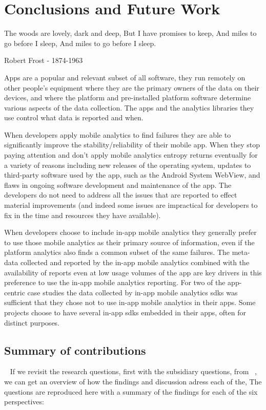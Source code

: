 \setchapterpreamble[u]{\margintoc}
\chapter{Conclusions and Future Work}\label{chapter-conclusions-and-future-work}

\epigraph{The woods are lovely, dark and deep,
But I have promises to keep,   
And miles to go before I sleep,   
And miles to go before I sleep.}{Robert Frost - 1874-1963}

Apps are a popular and relevant subset of all software, they run remotely on other people’s equipment where they are the primary owners of the data on their devices, and where the platform and pre-installed platform software determine various aspects of the data collection. The apps and the analytics libraries they use control what data is reported and when. 

When developers apply mobile analytics to find failures they are able to significantly improve the stability/reliability of their mobile app. When they stop paying attention and don't apply mobile analytics entropy returns eventually for a variety of reasons including new releases of the operating system, updates to third-party software used by the app, such as the Android System WebView, and flaws in ongoing software development and maintenance of the app. The developers do not need to address all the issues that are reported to effect material improvements (and indeed some issues are impractical for developers to fix in the time and resources they have available).

When developers choose to include in-app mobile analytics they generally prefer to use those mobile analytics as their primary source of information, even if the platform analytics also finds a common subset of the same failures. The meta-data collected and reported by the in-app mobile analytics combined with the availability of reports even at low usage volumes of the app are key drivers in this preference to use the in-app mobile analytics reporting. For two of the app-centric case studies the data collected by in-app mobile analytics \Glspl{sdk} was sufficient that they chose not to use in-app mobile analytics in their apps. Some projects choose to have several in-app \Glspl{sdk} embedded in their apps, often for distinct purposes.


\section{Summary of contributions}~\label{conclusions-summary-of-contributions}
If we revisit the research questions, first with the subsidiary questions, from ~, we can get an overview of how the findings and discussion adress each of the,  The questions are reproduced here with a summary of the findings for each of the six perspectives: 

